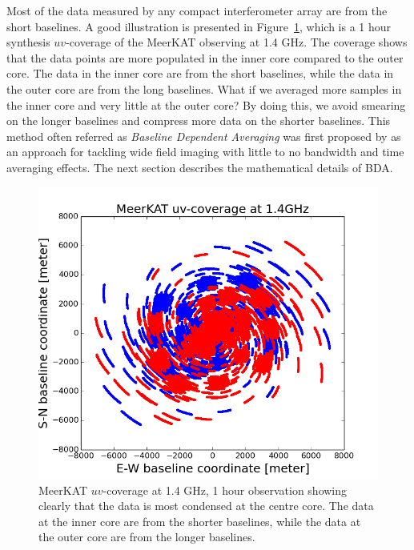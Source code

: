 \documentclass[useAMS,usenatbib]{mn2e}
\begin{document}
Most of the data measured by any compact interferometer array are from the short baselines. A good illustration is presented in 
Figure~\ref{fig:meerkat}, which is a 1 hour synthesis $uv$-coverage
of the MeerKAT observing at 1.4 GHz. The coverage shows that the data points are more populated in the inner core compared
to the outer core. The data in the inner core are from the short baselines, while the data in the outer core are from the long baselines. 
What if we averaged more samples in the inner core and very little at the outer core? By doing this, 
we avoid smearing
on the longer baselines and compress more data on the shorter baselines. This method 
often referred as \textit{Baseline Dependent Averaging}
was first proposed by \citet{cotton1989special,cotton1999special} as an approach for tackling wide field imaging with little to no
bandwidth and time averaging effects. The next section  describes the mathematical details of BDA.
\begin{figure}
\includegraphics[width=1\columnwidth]{./Figures/uv-coverage-meerkat.png}
\caption{MeerKAT $uv$-coverage at 1.4 GHz, 1 hour observation showing clearly that the data is most 
condensed at the centre core. The data at the inner core are from the shorter baselines, while the data at the outer core
are from the longer baselines.}\label{fig:meerkat}
\end{figure}
\end{document}
